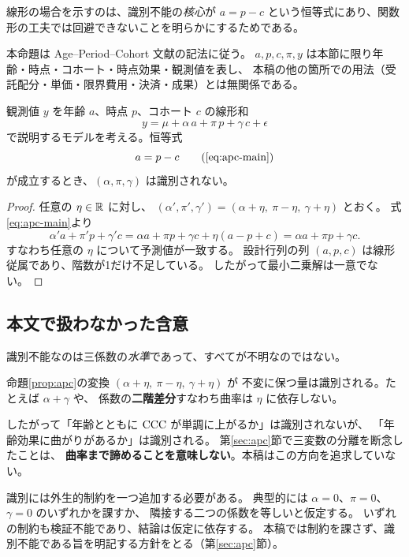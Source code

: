 線形の場合を示すのは、識別不能の\emph{核心}が
$a=p-c$ という恒等式にあり、関数形の工夫では回避できないことを明らかにするためである。

\begin{proposition}
\label{prop:apc}
本命題は Age--Period--Cohort 文献の記法に従う。
$a,p,c,\pi,y$ は本節に限り年齢・時点・コホート・時点効果・観測値を表し、
本稿の他の箇所での用法（受託配分・単価・限界費用・決済・成果）とは無関係である。

観測値 $y$ を年齢 $a$、時点 $p$、コホート $c$ の線形和
\[
y = \mu + \alpha\,a + \pi\,p + \gamma\,c + \epsilon
\]
で説明するモデルを考える。恒等式
\begin{equation}
a = p - c \tag{\ref{eq:apc-main}}
\end{equation}
が成立するとき、$(\alpha,\pi,\gamma)$ は識別されない。
\end{proposition}

\begin{proof}
任意の $\eta\in\mathbb{R}$ に対し、
$(\alpha',\pi',\gamma') = (\alpha+\eta,\ \pi-\eta,\ \gamma+\eta)$ とおく。
式\eqref{eq:apc-main}より
\[
\alpha' a + \pi' p + \gamma' c
= \alpha a + \pi p + \gamma c + \eta(a - p + c)
= \alpha a + \pi p + \gamma c .
\]
すなわち任意の $\eta$ について予測値が一致する。
設計行列の列 $(a,p,c)$ は線形従属であり、階数が1だけ不足している。
したがって最小二乗解は一意でない。
\end{proof}

\subsection{本文で扱わなかった含意}

\begin{remark}
\label{rem:apc-identified}
識別不能なのは三係数の\emph{水準}であって、すべてが不明なのではない。

命題\ref{prop:apc}の変換 $(\alpha+\eta,\ \pi-\eta,\ \gamma+\eta)$ が
不変に保つ量は識別される。たとえば $\alpha+\gamma$ や、
係数の\textbf{二階差分}すなわち曲率は $\eta$ に依存しない。

したがって「年齢とともに $\mathrm{CCC}$ が単調に上がるか」は識別されないが、
「年齢効果に曲がりがあるか」は識別される。
第\ref{sec:apc}節で三変数の分離を断念したことは、
\textbf{曲率まで諦めることを意味しない}。本稿はこの方向を追求していない。
\end{remark}

\begin{remark}[識別のための制約]
識別には外生的制約を一つ追加する必要がある。
典型的には $\alpha=0$、$\pi=0$、$\gamma=0$ のいずれかを課すか、
隣接する二つの係数を等しいと仮定する。
いずれの制約も検証不能であり、結論は仮定に依存する。
本稿では制約を課さず、識別不能である旨を明記する方針をとる（第\ref{sec:apc}節）。
\end{remark}

